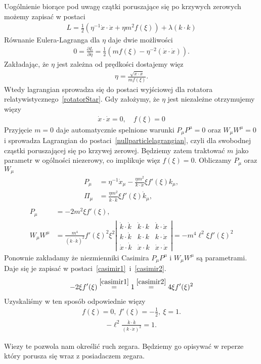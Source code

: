 Uogólnienie biorące pod uwagę czątki poruszające się
po krzywych zerowych możemy zapisać w 
postaci~\cite{polchinski_1998}
\begin{align*}
L =  \frac{1}{2} \left(  
\eta^{-1} \dot{x} \cdot \dot{x} +  \eta m^2 f( \xi ) \right)  
+ \lambda ( k\cdot k )
\end{align*}
Równanie Eulera-Lagranga dla $\eta$ daje dwie możliwości
\begin{align*}
0 = \frac{\partial L }{\partial \eta} =  \frac{1}{2}
\left(m f(\xi) - \eta^{-2} ( \dot{x} \cdot \dot{x} )
  \right).
\end{align*}
Zakładając, że $\eta$ jest zależna od prędkości 
dostajemy więz
\begin{align*}
\eta = \frac{\sqrt{\dot{x} \cdot \dot{x}}}{m f(\xi)}.
\end{align*}
Wtedy lagrangian sprowadza się do postaci wyjściowej 
dla rotatora relatywistycznego~\ref{rotatorStar}.
Gdy założymy, że $\eta$ jest niezależne otrzymujemy
więzy 
\begin{align*}
\dot{x} \cdot \dot{x} = 0, \quad f(\xi) = 0
\end{align*}
Przyjęcie $m =0$ daje automatycznie spelnione warunki 
$P_\mu P^\mu =0$ oraz $W_\mu W^\mu = 0$ i sprowadza 
Lagrangian do postaci~\ref{nullparticlelagrangian}, 
czyli dla swobodnej cząstki 
poruszającej się po krzywej zerowej.
Będziemy zatem traktować $m$ jako parametr w ogólności
niezerowy, co implikuje więz $f(\xi)=0$.
Obliczamy $P_\mu$ oraz $W_\mu$
\begin{align*}
P_\mu &= \eta^{-1} \dot{x}_\mu - 
\frac{\eta m^2}{k\cdot \dot{x}} \xi f'(\xi) k_\mu,\\
\Pi_\mu &= \frac{\eta m^2}{\dot{k}\cdot \dot{k}}
\xi f'(\xi) \dot{k}_\mu, \\
\end{align*}
\begin{align*}
P_\mu &= -2 m^2 \xi f'(\xi),\\
W_\mu W^\mu &= \frac{m^4}{(\dot{k}\cdot \dot{k})^2}
f'(\xi)^2 \xi^2 
\left| 
\begin{array}{ccc}
\dot{k} \cdot \dot{k}& \dot{k} \cdot k& \dot{k} \cdot \dot{x}\\
k \cdot \dot{k}& k \cdot k &k  \cdot \dot{x}\\
\dot{x} \cdot \dot{k}& \dot{x} \cdot k &\dot{x} \cdot \dot{x}
\end{array}
\right|= 
- m^4 \ell^2 \xi f'(\xi)^2
\end{align*}
Ponownie zakładamy
że niezmienniki Casimira $P_\mu P^\mu$ i $W_\mu W^\mu$ 
są parametrami. Daje się 
je zapisać w postaci~\ref{casimir1}~i~\ref{casimir2}.
\begin{align*} 
 -2 \xi f'(\xi)
\stackrel{\ref{casimir1}}{=} 1 \stackrel{\ref{casimir2}}{=}
  4  \xi f'(\xi)^2
\end{align*}
Uzyskaliśmy w ten sposób odpowiednie więzy 
\begin{align*}
f(\xi) = 0, \ f'(\xi) =- \frac{1}{2},\ \xi = 1.
\end{align*}
\begin{align} \label{wiez}
 - \ell^2 \frac{\dot{k} \cdot \dot{k}}{ ( k \cdot \dot{x})^2 } = 1.
\end{align}

Wiezy te pozwola nam określić ruch zegara. 
Będziemy go opisywać w reperze który porusza się 
wraz z posiadaczem zegara.  
